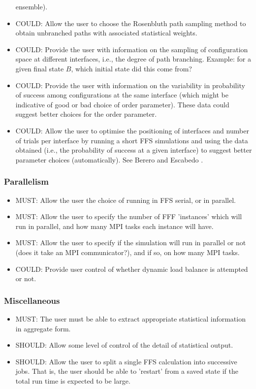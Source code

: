 \documentclass[11pt]{article}
\begin{document}
\begin{itemize}
ensemble).
\item
COULD: Allow the user to choose the Rosenbluth path sampling method to
obtain unbranched paths with associated statistical weights.
\item
COULD: Provide the user with information on the sampling of configuration
space at different interfaces, i.e., the degree of path branching.
Example: for a given final state $B$, which initial state did this come from?
\item
COULD: Provide the user with information on the variability in
probability of success among configurations at the same interface
(which might be indicative of good or bad choice of order parameter).
These data could suggest better choices for the order parameter.
\item
COULD: Allow the user to optimise the positioning of interfaces
and number of trials per interface by running a short FFS simulations
and using the data obtained (i.e., the probability of success at a
given interface) to suggest better parameter choices (automatically).
See Berero and Escabedo \cite{}.
\end{itemize}

\subsubsection{Parallelism}
\begin{itemize}
\item
MUST: Allow the user the choice of running in FFS serial, or in parallel.
\item
MUST: Allow the user to specify the number of FFF 'instances' which will
run in parallel, and how many MPI tasks each instance will have.
\item
MUST: Allow the user to specify if the simulation will run in parallel
or not (does it take an MPI communicator?), and if so, on how many
MPI tasks.
\item
COULD: Provide user control of whether dynamic load balance is attempted
or not.
\end{itemize}

\subsubsection{Miscellaneous}

\begin{itemize}
\item
MUST: The user must be able to extract appropriate statistical information
in aggregate form.
\item
SHOULD: Allow some level of control of the detail of statistical output.
\item
SHOULD: Allow the user to split a single FFS calculation into successive
jobs. That is, the user should be able to 'restart' from a saved state
if the total run time is expected to be large.
\end{itemize}
\end{document}
